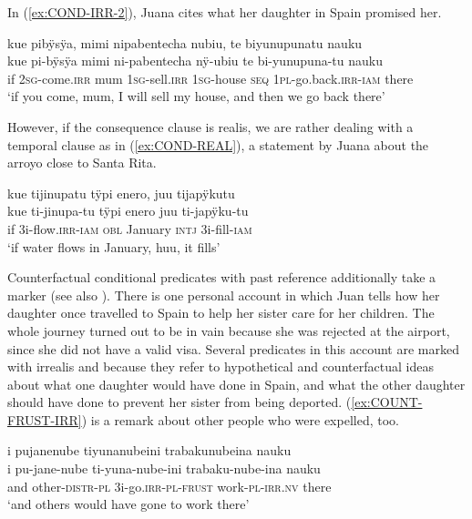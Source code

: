 In (\ref{ex:COND-IRR-2}), Juana cites what her daughter in Spain promised her.

\ea\label{ex:COND-IRR-2}
\begingl
\glpreamble kue pibÿsÿa, mimi nipabentecha nubiu, te biyunupunatu nauku\\
\gla kue pi-bÿsÿa mimi ni-pabentecha nÿ-ubiu te bi-yunupuna-tu nauku\\
\glb if 2\textsc{sg}-come.\textsc{irr} mum 1\textsc{sg}-sell.\textsc{irr} 1\textsc{sg}-house \textsc{seq} 1\textsc{pl}-go.back.\textsc{irr}-\textsc{iam} there\\
\glft ‘if you come, mum, I will sell my house, and then we go back there’
\endgl
 \trailingcitation{[jxx-p110923l-1.432]}
\xe
{}

However, if the consequence clause is realis, we are rather dealing with a temporal clause as in (\ref{ex:COND-REAL}), a statement by Juana about the arroyo close to Santa Rita.%

\ea\label{ex:COND-REAL}
\begingl
\glpreamble kue tijinupatu tÿpi enero, juu tijapÿkutu\\
\gla kue ti-jinupa-tu tÿpi enero juu ti-japÿku-tu\\
\glb if 3i-flow.\textsc{irr}-\textsc{iam} \textsc{obl} January \textsc{intj} 3i-fill-\textsc{iam}\\
\glft ‘if water flows in January, huu, it fills’
\endgl
 \trailingcitation{[jxx-a120516l-a.572-573]}
\xe
{}

Counterfactual conditional predicates with past reference additionally take a  mark\-er (see also ). There is one personal account in which Juan tells how her daughter once travelled to Spain to help her sister care for her children. The whole journey turned out to be in vain because she was rejected at the airport, since she did not have a valid visa. Several predicates in this account are marked with irrealis and  because they refer to hypothetical and counterfactual ideas about what one daughter would have done in Spain, and what the other daughter should have done to prevent her sister from being deported. (\ref{ex:COUNT-FRUST-IRR}) is a remark about other people who were expelled, too.

\ea\label{ex:COUNT-FRUST-IRR}
\begingl 
\glpreamble i pujanenube tiyunanubeini trabakunubeina nauku \\
\gla i pu-jane-nube ti-yuna-nube-ini trabaku-nube-ina nauku \\ 
\glb and other-\textsc{distr}-\textsc{pl} 3i-go.\textsc{irr}-\textsc{pl}-\textsc{frust} work-\textsc{pl}-\textsc{irr.nv} there\\ 
\glft ‘and others would have gone to work there’
 \trailingcitation{[jxx-p120430l-1.206]}
\xe
{}

